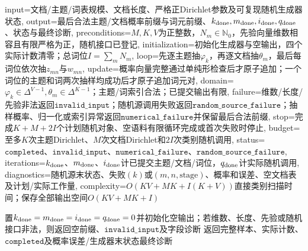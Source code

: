 \begin{AlgorithmContract}{
  input={文档/主题/词表规模、文档长度、严格正Dirichlet参数及可复现随机生成器状态},
  output={最后合法主题/文档概率前缀与词元前缀、$k_{\rm done},m_{\rm done},i_{\rm done},q_{\rm done}$、状态与最终诊断},
  preconditions={$M,K,V$为正整数，$N_m\in\mathbb N_0$，先验向量维数相容且有限严格为正，随机接口已登记},
  initialization={初始化生成器与空输出，四个实际计数清零；总词位$I=\sum_mN_m$},
  loop={先逐主题抽$\varphi_k$，再逐文档抽$\theta_m$，最后每词位依次抽$z_{mn}$与$w_{mn}$},
  update={概率向量完整通过单纯形检查后才原子追加；一个词位的主题和词两次抽样均成功后才原子追加词元对},
  domain={$\varphi_k\in\Delta^{V-1},\theta_m\in\Delta^{K-1}$；主题/词索引合法；已提交输出有限},
  failure={维数/长度/先验非法返回$\mathtt{invalid\_input}$；随机源调用失败返回$\mathtt{random\_source\_failure}$；抽样概率、归一化或索引异常返回$\mathtt{numerical\_failure}$并保留最后合法前缀},
  stop={完成$K+M+2I$个计划随机对象、空语料有限循环完成或首次失败时停止},
  budget={至多$K$次主题Dirichlet、$M$次文档Dirichlet和$2I$次类别随机调用},
  status={$\mathtt{completed}$、$\mathtt{invalid\_input}$、$\mathtt{numerical\_failure}$、$\mathtt{random\_source\_failure}$},
  iterations={$k_{\rm done}$、$m_{\rm done}$、$i_{\rm done}$计已提交主题/文档/词位，$q_{\rm done}$计实际随机调用},
  diagnostics={随机源末状态、失败$(k)$或$(m,n,\mathrm{stage})$、概率和误差、空文档表及计划/实际工作量},
  complexity={$O(KV+MK+I(K+V))$直接类别扫描时间；保存全部输出空间$O(KV+MK+I)$}
}
\begin{algorithm}[tbp]
\caption{LDA文本生成（祖先采样）}\label{alg:V5-C06-generate}
置$k_{\rm done}=m_{\rm done}=i_{\rm done}=q_{\rm done}=0$并初始化空输出；若维数、长度、先验或随机接口非法，则返回空前缀、$\mathtt{invalid\_input}$及字段诊断\;
返回完整样本、实际计数、$\mathtt{completed}$及概率误差/生成器末状态最终诊断\;
\end{algorithm}
\end{AlgorithmContract}
\endgroup

